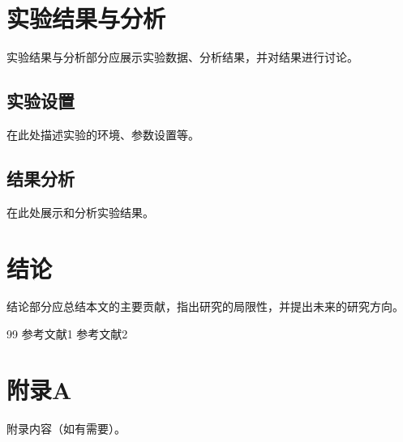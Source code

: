 \documentclass[12pt,a4paper,twocolumn]{article}
\begin{document}
\section{实验结果与分析}
实验结果与分析部分应展示实验数据、分析结果，并对结果进行讨论。

\subsection{实验设置}
在此处描述实验的环境、参数设置等。

\subsection{结果分析}
在此处展示和分析实验结果。

\section{结论}
结论部分应总结本文的主要贡献，指出研究的局限性，并提出未来的研究方向。

\begin{thebibliography}{99}
 参考文献1
 参考文献2
\end{thebibliography}

\appendix
\section{附录A}
附录内容（如有需要）。
\end{document}
